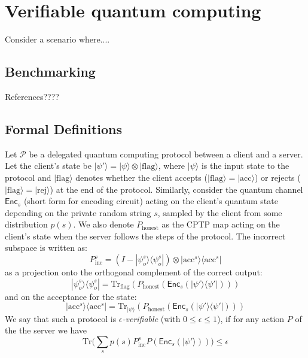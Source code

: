 %
%



\section{Verifiable quantum computing} 


Consider a scenario where....


\subsection{Benchmarking}
References???? 
\subsection{Formal Definitions}

\begin{definition}
\label{def:vbqc}
Let $\mathcal{P}$ be a delegated quantum computing protocol between a client and a server.  Let the client's state be $|\psi'\rangle =  |\psi\rangle \otimes |\text{flag}\rangle$, where $|\psi\rangle$ is the input state to the protocol and $|\text{flag}\rangle$ denotes whether the client accepts ($|\text{flag}\rangle = |\text{acc}\rangle$) or rejects ($|\text{flag}\rangle = |\text{rej}\rangle$) at the end of the protocol. Similarly, consider the quantum channel $\mathsf{Enc}_s$ (short form for encoding circuit) acting on the client's quantum state depending on the private random string $s$, sampled by the client from some distribution $p(s)$.  We also denote $P_\text{honest}$ as the CPTP map acting on the client's state when the server follows the steps of the protocol. The incorrect subspace is written as: 
\begin{equation}
P^s_\text{inc} = (I - |\psi_o^s\rangle \langle \psi_o^s|) \otimes |\text{acc}^s\rangle \langle \text{acc}^s|
\end{equation}
as a projection onto the orthogonal complement of the correct output: 
\begin{equation}
|\psi_o^s\rangle \langle \psi_o^s | = {\text{Tr}}_{\text{flag}}(P_\text{honest}(\mathsf{Enc}_s(|\psi'\rangle \langle \psi'|)))
\end{equation}
and on the acceptance for the  state: 
\begin{equation}
|\text{acc}^s\rangle \langle \text{acc}^s| = {\text{Tr}}_{|\psi\rangle}(P_\text{honest}(\mathsf{Enc}_s(|\psi'\rangle \langle \psi'|)))
\end{equation}
We say that such a protocol is \textit{$\epsilon$-verifiable} (with $0\leq \epsilon \leq 1$), if for any action $P$ of the the server we have
\begin{equation} \label{eq:verif}
\text{Tr} \big( \sum_s p(s) P^s_\text{inc} P(\mathsf{Enc}_s(|\psi'\rangle)) \big) \leq \epsilon
\end{equation}
\end{definition}

